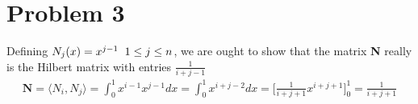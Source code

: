 \documentclass[a4paper,norsk]{article}
\begin{document}
\section*{Problem 3}
Defining $N_j(x) = x^{j-1} \hspace{2mm} 1 \leq j \leq n$, we are ought to show that the matrix \textbf{N} really is the Hilbert matrix with entries $\frac{1}{i + j - 1}$
\begin{align}
\mathbf{N} = \langle N_i, N_j \rangle = \int_0^1 x^{i - 1} x^{j - 1} dx = \int_0^1 x^{i + j- 2} dx = \Big[\frac{1}{i+j+1} x^{i+j+1} \Big]_0^1 = \frac{1}{i+j+1} 
\end{align}
\end{document}
